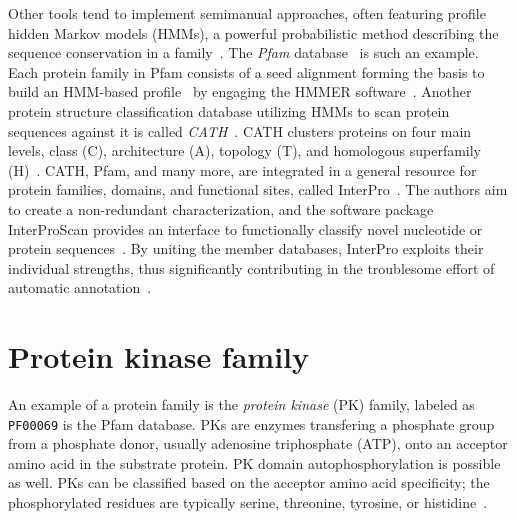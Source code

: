   Other tools tend to implement semimanual approaches, often featuring
  profile hidden Markov models (HMMs), a powerful probabilistic method describing the
  sequence conservation in a family~\cite{krogh1994hidden, eddy1996hidden}.
  The \emph{Pfam} database~\cite{sonnhammer1997pfam} is such an example.
  Each protein family in Pfam consists of a seed alignment forming the basis to
  build an HMM-based profile~\cite{el2019pfam} by engaging the HMMER
  software~\cite{finn2010pfam, finn2011hmmer}.
  Another protein structure classification database utilizing HMMs to scan protein
  sequences against it is called \emph{CATH}~\cite{dawson2017cath}.
  CATH clusters proteins on four main levels, class (C), architecture (A), topology (T),
  and homologous superfamily (H)~\cite{orengo1997cath}.
  CATH, Pfam, and many more, are integrated in a general resource for protein families,
  domains, and functional sites, called InterPro~\cite{finn2017interpro}.
  The authors aim to create a non-redundant characterization, and the software package
  InterProScan provides an interface to functionally classify novel nucleotide or protein
  sequences~\cite{zdobnov2001interproscan}.
  By uniting the member databases, InterPro exploits their individual strengths, thus
  significantly contributing in the troublesome effort of automatic
  annotation~\cite{apweiler2000interpro}.


\section{Protein kinase family}
\label{intro:pkinase}

  An example of a protein family is the \emph{protein kinase} (PK) family, labeled as
  \texttt{PF00069} is the Pfam database.
  PKs are enzymes transfering a phosphate group from a phosphate donor, usually
  adenosine triphosphate (ATP), onto an acceptor amino acid in the substrate protein.
  PK domain autophosphorylation is possible as well.
  PKs can be classified based on the acceptor amino acid specificity; the phosphorylated
  residues are typically serine, threonine, tyrosine, or histidine~\cite{hunter19911}.

